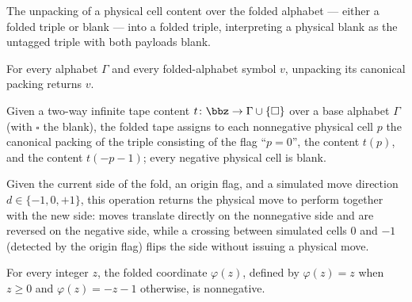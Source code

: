 \begin{definition}
\label{Turing.FinTM.foldUnpack}
\leanok
{}
The unpacking of a physical cell content over the folded alphabet --- either a folded
triple or blank --- into a folded triple, interpreting a physical blank as the
untagged triple with both payloads blank.
\end{definition}

\begin{lemma}
\label{Turing.FinTM.foldUnpack_pack}
\leanok
{}
For every alphabet $\Gamma$ and every folded-alphabet symbol $v$, unpacking its
canonical packing returns $v$.
\end{lemma}

\begin{definition}
\label{Turing.FinTM.foldTape}
\leanok
{}
Given a two-way infinite tape content $t \colon \bbz \to \Gamma \cup \{\square\}$
over a base alphabet $\Gamma$ (with $\square$ the blank), the folded tape assigns to
each nonnegative physical cell $p$ the canonical packing of the triple consisting of
the flag ``$p = 0$'', the content $t(p)$, and the content $t(-p-1)$; every negative
physical cell is blank.
\end{definition}

\begin{definition}
\label{Turing.FinTM.foldMove}
\leanok
Given the current side of the fold, an origin flag, and a simulated move direction
$d \in \{-1, 0, +1\}$, this operation returns the physical move to perform together
with the new side: moves translate directly on the nonnegative side and are reversed
on the negative side, while a crossing between simulated cells $0$ and $-1$
(detected by the origin flag) flips the side without issuing a physical move.
\end{definition}

\begin{lemma}
\label{Turing.FinTM.foldPos_nonneg}
\leanok
{}
For every integer $z$, the folded coordinate $\varphi(z)$, defined by $\varphi(z)=z$
when $z\ge 0$ and $\varphi(z)=-z-1$ otherwise, is nonnegative.
\end{lemma}

